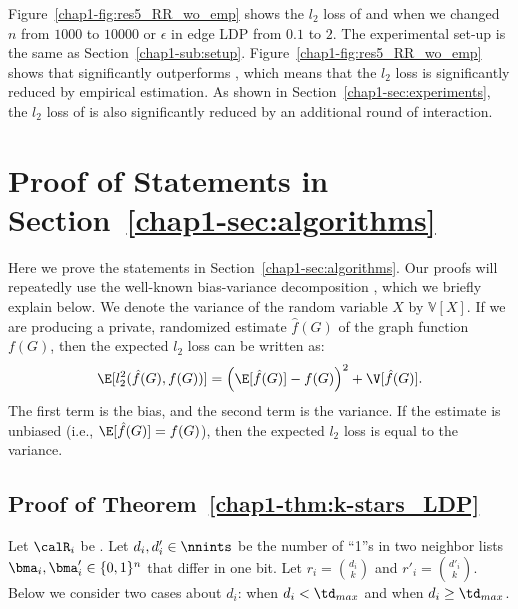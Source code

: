 Figure~\ref{chap1-fig:res5_RR_wo_emp} shows the $l_2$ loss of  and  when we changed $n$ from $1000$ to $10000$ or $\epsilon$ in edge LDP from $0.1$ to $2$. 
The experimental set-up is the same as Section~\ref{chap1-sub:setup}. 
Figure~\ref{chap1-fig:res5_RR_wo_emp} shows that  significantly outperforms , which means that the $l_2$ loss is significantly reduced by empirical estimation. 
As shown in Section~\ref{chap1-sec:experiments}, the $l_2$ loss of  is also significantly reduced by an additional round of interaction.

\section{Proof of Statements in Section~\ref{chap1-sec:algorithms}}
\label{chap1-sec:proof}
Here we prove the statements in Section~\ref{chap1-sec:algorithms}. 
Our proofs will repeatedly use the well-known bias-variance decomposition \cite{mlpp}, which we briefly explain below. 
We denote the variance of the random variable $X$ by $\mathbb{V}[X]$. 
If we are producing a private, randomized estimate $\hat{f}(G)$ of the graph function $f(G)$, then the expected $l_2$ loss can be written as: 
\begin{equation}\label{chap1-eq:bias-var}
  \E[l_2^2(\hat{f}(G),f(G))] = \left(\E[\hat{f}(G)] - f(G)\right)^2
  + \V[\hat{f}(G)].
\end{equation}
The first term is the bias, and the second term is the variance. 
If the estimate is unbiased (i.e., $\E[\hat{f}(G)] = f(G)$), then the expected $l_2$ loss is equal to the variance.

\subsection{Proof of Theorem~\ref{chap1-thm:k-stars_LDP}}
Let $\calR_i$ be . 
Let $d_i,d'_i \in \nnints$ be the number of ``1''s in two neighbor lists $\bma_i,\bma'_i \in \{0,1\}^n$ that differ in one bit. 
Let $r_i = \binom{d_i}{k}$ and $r'_i = \binom{d'_i}{k}$. 
Below we consider two cases about $d_i$: when $d_i < \td_{max}$ and when $d_i \geq \td_{max}$.


